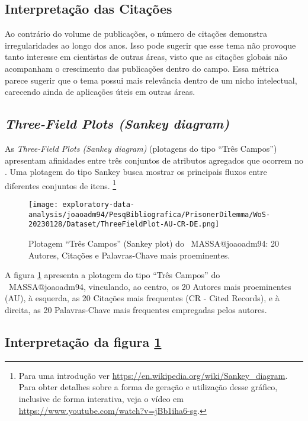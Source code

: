 \subsection{Interpretação das Citações}
Ao contrário do volume de publicações, o número de citações demonstra irregularidades ao longo dos anos. Isso pode sugerir que esse tema não provoque tanto interesse em cientistas de outras áreas, visto que as citações globais não acompanham o crescimento das publicações dentro do campo. Essa métrica parece sugerir que o tema possui mais relevância dentro de um nicho intelectual, carecendo ainda de aplicações úteis em outras áreas.

\subsection{\textit{Three-Field Plots (Sankey diagram)} \label{MASSA:Sankey}}

As \textit{Three-Field Plots (Sankey diagram)} (plotagens do tipo ``Três Campos'') apresentam afinidades entre três conjuntos de atributos agregados que ocorrem no \dataset. Uma plotagem do tipo Sankey busca mostrar os principais fluxos entre diferentes conjuntos de itens. \footnote{Para uma introdução ver \url{https://en.wikipedia.org/wiki/Sankey_diagram}. Para obter detalhes sobre a forma de geração e utilização desse gráfico, inclusive de forma interativa, veja o vídeo em \url{https://www.youtube.com/watch?v=jBb1iha6-sg}.} 

\begin{figure}
    \centering
    \texttt{[image: exploratory-data-analysis/joaoadm94/PesqBibliografica/PrisonerDilemma/WoS-20230128/Dataset/ThreeFieldPlot-AU-CR-DE.png]}
    \caption{Plotagem ``Três Campos'' (Sankey plot) do \dataset\   MASSA@joaoadm94: 20 Autores, Citações e Palavras-Chave mais proeminentes.}
    \label{fig:MASSA@joaoadm94:ThreeFieldPlot}
\end{figure}

A figura \ref{fig:MASSA@joaoadm94:ThreeFieldPlot} apresenta a plotagem do tipo ``Três Campos'' do \dataset\   MASSA@joaoadm94, vinculando, ao centro, os 20 Autores mais proeminentes (AU), à esquerda, as 20 Citações mais frequentes (CR - Cited Records), e à direita, as 20 Palavras-Chave mais frequentes empregadas pelos autores.

\subsection{Interpretação da figura \ref{fig:MASSA@joaoadm94:ThreeFieldPlot}}

